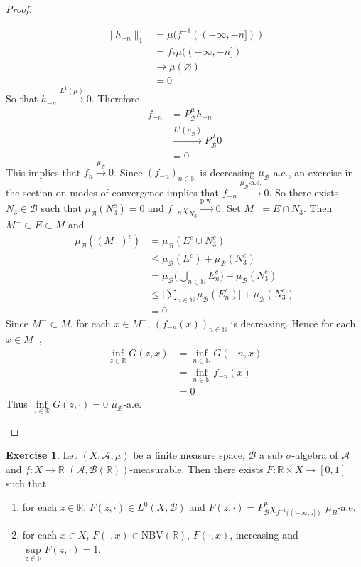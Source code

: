 \documentclass{book}
\theoremstyle{definition}
\newtheorem{ex}[definition]{Exercise}
\newcommand{\sig}{\sigma}
\newcommand{\N}{\mathbb{N}}
\newcommand{\R}{\mathbb{R}}
\newcommand{\MA}{\mathcal{A}}
\newcommand{\MB}{\mathcal{B}}
\DeclareMathOperator*{\0}{\mbf{0}}
\DeclareMathOperator*{\1}{\mbf{1}}
\newcommand{\convt}[1]{\xrightarrow{\text{#1}}}
\newcommand{\conv}[1]{\xrightarrow{#1}}
\newcommand{\NBV}{\text{NBV}}
\begin{document}
\begin{proof}
\begin{enumerate}
		\begin{align*}
			\|h_{-n}\|_1
			& = \mu(f^{-1}((-\infty, -n])) \\
			& = f_*\mu((-\infty, -n]) \\
			& \rightarrow \mu(\varnothing) \\
			& = 0 
		\end{align*}
		So that $h_{-n} \conv{L^1(\mu)} 0$. Therefore  
		\begin{align*}
			f_{-n}
			& = P^{\mu}_{\MB} h_{-n} \\
			& \conv{L^1(\mu_{\MB})} P^{\mu}_{\MB} 0 \\
			& = 0
		\end{align*}
		This implies that $f_n \conv{\mu_{\MB}} 0$. Since $(f_{-n})_{n \in \N}$ is decreasing $\mu_{\MB}$-a.e., an exercise in the section on modes of convergence implies that $f_{-n} \convt{$\mu_{\MB}$-a.e.} 0$. So there exists $N_3 \in \MB$ such that $\mu_{\MB}(N_3^c) = 0$ and $f_{-n} \chi_{N_3} \convt{p.w.} 0$. Set $M^- = E \cap N_3$. Then $M^- \subset E \subset M$ and
		\begin{align*}
			\mu_{\MB}((M^-)^c)
			& = \mu_{\MB}(E^c \cup N_3^c) \\ 
			& \leq \mu_{\MB}(E^c) + \mu_{\MB}(N_3^c) \\
			& = \mu_{\MB} \bigg( \bigcup_{n \in \N} E_n^c \bigg) + \mu_{\MB}(N_3^c) \\
			& \leq \bigg[\sum_{n \in \N} \mu_{\MB}(E_n^c) \bigg] + \mu_{\MB}(N_3^c) \\
			& = 0
		\end{align*}
		Since $M^- \subset M$, for each $x \in M^-$, $(f_{-n}(x))_{n \in \N}$ is decreasing. Hence for each $x \in M^-$,
		\begin{align*}
			\inf\limits_{z \in \R} G(z, x) 
			& = \inf\limits_{n \in \N} G(-n, x) \\
			& = \inf\limits_{n \in \N} f_{-n}(x) \\
			& = 0
		\end{align*}
		Thus $\inf\limits_{z \in \R} G(z, \cdot) = 0$ $\mu_{\MB}$-a.e.
		\end{enumerate}
	\end{proof}

	\begin{ex}
		Let $(X, \MA, \mu)$ be a finite measure space, $\MB$ a sub $\sig$-algebra of $\MA$ and $f: X \rightarrow \R$ $(\MA, \MB(\R))$-measurable. Then there exists $F: \R \times X \rightarrow [0,1]$ such that
		\begin{enumerate}
			\item for each $z \in \R$, $F(z, \cdot) \in L^0(X, \MB)$ and $F(z, \cdot) = P^{\mu}_{\MB}\chi_{f^{-1}((-\infty, z])}$ $\mu_B$-a.e.
			\item for each $x \in X$, $F(\cdot, x) \in \NBV(\R)$, $F(\cdot, x)$, increasing and $\sup\limits_{z \in \R} F(z, \cdot) = 1$.
		\end{enumerate}
	\end{ex}
\end{document}
